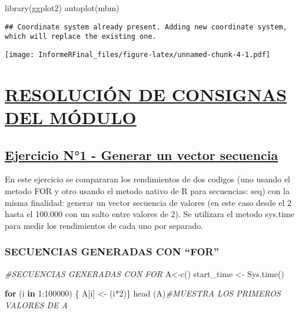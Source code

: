 \documentclass[preprint, 3p,
authoryear]{elsarticle} %
\newenvironment{Shaded}{\begin{snugshade}}{\end{snugshade}}
\newcommand{\CommentTok}[1]{\textcolor[rgb]{0.56,0.35,0.01}{\textit{#1}}}
\newcommand{\ControlFlowTok}[1]{\textcolor[rgb]{0.13,0.29,0.53}{\textbf{#1}}}
\newcommand{\DecValTok}[1]{\textcolor[rgb]{0.00,0.00,0.81}{#1}}
\newcommand{\FunctionTok}[1]{\textcolor[rgb]{0.00,0.00,0.00}{#1}}
\newcommand{\NormalTok}[1]{#1}
\newcommand{\OtherTok}[1]{\textcolor[rgb]{0.56,0.35,0.01}{#1}}
\newcommand{\SpecialCharTok}[1]{\textcolor[rgb]{0.00,0.00,0.00}{#1}}
\begin{document}
\begin{Shaded}
\begin{Highlighting}[]
\FunctionTok{library}\NormalTok{(ggplot2)}
\FunctionTok{autoplot}\NormalTok{(mbm)}
\end{Highlighting}
\end{Shaded}

\begin{verbatim}
## Coordinate system already present. Adding new coordinate system, which will replace the existing one.
\end{verbatim}

\texttt{[image: InformeRFinal\_files/figure-latex/unnamed-chunk-4-1.pdf]}

\hypertarget{resoluciuxf3n-de-consignas-del-muxf3dulo}{%
\section{\texorpdfstring{\uline{\textbf{RESOLUCIÓN DE CONSIGNAS DEL
MÓDULO}}}{RESOLUCIÓN DE CONSIGNAS DEL MÓDULO}}\label{resoluciuxf3n-de-consignas-del-muxf3dulo}}

\hypertarget{ejercicio-n1---generar-un-vector-secuencia}{%
\subsection{\texorpdfstring{\uline{\textbf{Ejercicio N°1 - Generar un
vector
secuencia}}}{Ejercicio N°1 - Generar un vector secuencia}}\label{ejercicio-n1---generar-un-vector-secuencia}}

En este ejercicio se compararan los rendimientos de dos codigos (uno
usando el metodo FOR y otro usando el metodo nativo de R para
secuencias: seq) con la misma finalidad: generar un vector secuencia de
valores (en este caso desde el 2 hasta el 100.000 con un salto entre
valores de 2). Se utilizara el metodo sys.time para medir los
rendimientos de cada uno por separado.

\hypertarget{secuencias-generadas-con-for}{%
\subsubsection{SECUENCIAS GENERADAS CON
``FOR''}\label{secuencias-generadas-con-for}}

\begin{Shaded}
\begin{Highlighting}[]
\CommentTok{\#SECUENCIAS GENERADAS CON FOR}
\NormalTok{A}\OtherTok{\textless{}{-}}\FunctionTok{c}\NormalTok{()}
\NormalTok{start\_time }\OtherTok{\textless{}{-}} \FunctionTok{Sys.time}\NormalTok{()}

\ControlFlowTok{for}\NormalTok{ (i }\ControlFlowTok{in} \DecValTok{1}\SpecialCharTok{:}\DecValTok{100000}\NormalTok{) \{ A[i] }\OtherTok{\textless{}{-}}\NormalTok{ (i}\SpecialCharTok{*}\DecValTok{2}\NormalTok{)\}}
\FunctionTok{head}\NormalTok{ (A)}\CommentTok{\#MUESTRA LOS PRIMEROS VALORES DE A}
\end{Highlighting}
\end{Shaded}
\end{document}
